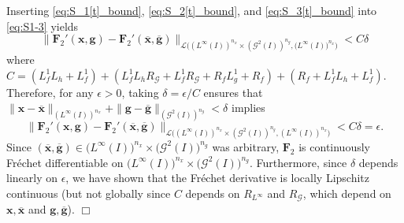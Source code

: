 \documentclass[onefignum,onetabnum]{siamart220329}
\numberwithin{equation}{section}
\newcommand{\bg}{\ensuremath{\mathbf{g}}} %
\newcommand{\bx}{\ensuremath{\mathbf{x}}} %
\newcommand{\BF}{\ensuremath{\mathbf{F}} } %
\newcommand {\cG} {\mathcal{G}}
\newcommand {\cL} {\mathcal{L}}
\newcommand{\LL}{\big(L^\infty(I) \big)^{n_x}}
\begin{document}
\begin{appendix}
     Inserting \cref{eq:S_1[t]_bound}, \cref{eq:S_2[t]_bound}, and \cref{eq:S_3[t]_bound} into \cref{eq:S1-3} yields
     \begin{equation*}
     	\| \BF_2'(\bx, \bg) - \BF_2'(\overline{\bx}, \overline{\bg}) \|_{\cL\big( (L^\infty(I))^{n_x} \times (\cG^2(I))^{n_g},\LL\big)}
     	< C \delta
     \end{equation*}
     where
     $C = (L_f^1  L_h + L_f^1) + (L_f^1  L_h  R_\cG + L_f^1  R_\cG + R_f  L_g^1 + R_f) + (R_f + L_f^1  L_h + L_f^1)$.
          Therefore, for any $\epsilon > 0$, taking $\delta = \epsilon/C$ ensures that 
     $\| \bx - \overline{\bx} \|_{(L^\infty(I))^{n_x}}+ \| \bg - \overline{\bg} \|_{(\cG^2(I))^{n_g} } < \delta$ implies 
    \[
          \| \BF_2'(\bx, \bg) - \BF_2'(\overline{\bx}, \overline{\bg}) \|_{\cL\big( (L^\infty(I))^{n_x} \times (\cG^2(I))^{n_g}, (L^\infty(I))^{n_x}\big)}  < C \delta = \epsilon.
      \]
     Since $(\overline{\bx}, \overline{\bg}) \in \big(L^\infty(I)\big)^{n_x} \times \big(\cG^2(I)\big)^{n_g}$ was arbitrary, $\BF_2$ is continuously Fr\'echet differentiable
     on $\big(L^\infty(I)\big)^{n_x} \times \big(\cG^2(I)\big)^{n_g}$. Furthermore, since $\delta$ depends linearly on $\epsilon$, we have shown that the Fr\'echet derivative is locally Lipschitz continuous (but not globally since $C$ depends on $R_{L^\infty}$ and $R_\cG$, which depend on $\bx, \overline{\bx}$ and $\bg, \overline{\bg}$).
\hfill $\Box$
 
\end{appendix}
\end{document}
